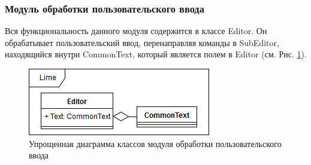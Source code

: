 \documentclass{fefu}
\begin{document}
			\subsubsection{Модуль обработки пользовательского ввода}
				\par Вся функциональность данного модуля содержится в классе Editor. Он
				обрабатывает пользовательский ввод, перенаправляя команды в SubEditor,
				находящийся внутри CommonText, который является полем в Editor (см. Рис. 
				\ref{diag:EditorScheme}).
				\begin{figure}[H]
					\centering
					\includegraphics[width=1\linewidth]{diagrams/EditorScheme.png}
					\caption{Упрощенная диаграмма классов модуля обработки пользовательского
					ввода}
					\label{diag:EditorScheme}
				\end{figure}
\end{document}
